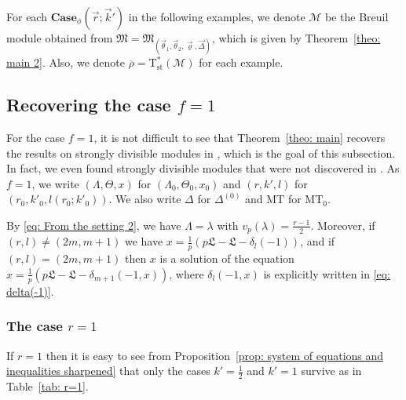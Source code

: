 \documentclass[11pt]{amsart}
\theoremstyle{definition}
\numberwithin{equation}{subsection}
\theoremstyle{plain}
\theoremstyle{plain}
\theoremstyle{plain}
\theoremstyle{plain}
\theoremstyle{plain}
\theoremstyle{plain}
\theoremstyle{plain}
\theoremstyle{plain}
\theoremstyle{plain}
\theoremstyle{plain}
\theoremstyle{plain}
\theoremstyle{plain}
\theoremstyle{definition}
\theoremstyle{definition}
\theoremstyle{definition}
\theoremstyle{remark}
\renewcommand{\(}{\textup{(}}
\renewcommand{\)}{\textup{)}}
\newcommand{\Tst}{\mathrm{T}_{\mathrm{st}}}
\newcommand{\rhobar}{\overline{\rho}}
\newcommand{\cM}{\mathcal{M}}
\newcommand{\fM}{\mathfrak{M}}
\newcommand{\fL}{\mathfrak{L}}
\newcommand{\vr}{\vec{r}}
\newcommand{\vk}{\vec{k}}
\newcommand{\vth}{\vec{\theta}}
\newcommand{\vrho}{\vec{\varrho}}
\newcommand{\vDel}{\vec{\Delta}}
\begin{document}
For each $\mathbf{Case}_\phi(\vr;\vk')$ in the following examples, we denote $\cM$ be the Breuil module obtained from $\fM=\fM_{(\vth_1,\vth_2,\vrho,\vDel)}$, which is given by Theorem~\ref{theo: main 2}. Also, we denote $\rhobar=\Tst^\ast(\cM)$ for each example.



\subsection{Recovering the case $f=1$}\label{subsec: f=1}
For the case $f=1$, it is not difficult to see that Theorem~\ref{theo: main} recovers the results on strongly divisible modules in \cite{BM,GP,LP}, which is the goal of this subsection. In fact, we even found strongly divisible modules that were not discovered in \cite{GP}. As $f=1$, we write $(\Lambda,\Theta,x)$ for $(\Lambda_0,\Theta_0,x_0)$ and $(r,k',l)$ for $(r_0,k'_0,l(r_0;k'_0))$. We also write $\Delta$ for $\Delta^{(0)}$ and $\mathrm{MT}$ for $\mathrm{MT}_0$. 

By \eqref{eq: From the setting 2}, we have $\Lambda=\lambda$ with $v_p(\lambda)=\frac{r-1}{2}$. Moreover, if $(r,l)\neq(2m,m+1)$ we have $x=\frac{1}{p}(p\fL-\fL-\delta_l(-1))$, and if $(r,l)=(2m,m+1)$ then $x$ is a solution of the equation $x=\frac{1}{p}(p\fL-\fL-\delta_{m+1}(-1,x))$, where $\delta_{l}(-1,x)$ is explicitly written in \eqref{eq: delta(-1)}.


\subsubsection{\textbf{The case $r=1$}}
If $r=1$ then it is easy to see from Proposition~\ref{prop: system of equations and inequalities sharpened} that only the cases $k'=\frac{1}{2}$ and $k'=1$ survive as in Table~\ref{tab: r=1}.
\end{document}
